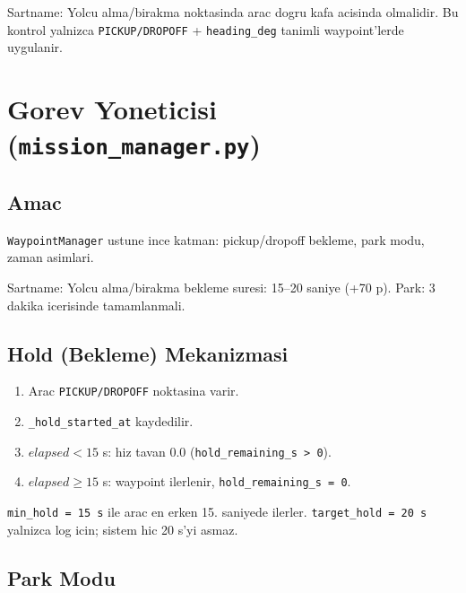 \documentclass[a4paper,12pt]{article}
\begin{document}
\begin{specbox}
Sartname: Yolcu alma/birakma noktasinda arac dogru kafa acisinda
olmalidir. Bu kontrol yalnizca \texttt{PICKUP/DROPOFF} + \texttt{heading\_deg}
tanimli waypoint'lerde uygulanir.
\end{specbox}

\section{Gorev Yoneticisi (\texttt{mission\_manager.py})}

\subsection{Amac}

\texttt{WaypointManager} ustune ince katman: pickup/dropoff bekleme,
park modu, zaman asimlari.

\begin{specbox}
Sartname: Yolcu alma/birakma bekleme suresi: 15--20 saniye (+70 p).
Park: 3 dakika icerisinde tamamlanmali.
\end{specbox}

\subsection{Hold (Bekleme) Mekanizmasi}

\begin{enumerate}
  \item Arac \texttt{PICKUP/DROPOFF} noktasina varir.
  \item \texttt{\_hold\_started\_at} kaydedilir.
  \item $elapsed < 15$ s: hiz tavan 0.0 (\texttt{hold\_remaining\_s > 0}).
  \item $elapsed \geq 15$ s: waypoint ilerlenir, \texttt{hold\_remaining\_s = 0}.
\end{enumerate}

\begin{warnbox}
\texttt{min\_hold = 15 s} ile arac en erken 15. saniyede ilerler.
\texttt{target\_hold = 20 s} yalnizca log icin; sistem hic 20 s'yi asmaz.
\end{warnbox}

\subsection{Park Modu}
\end{document}
